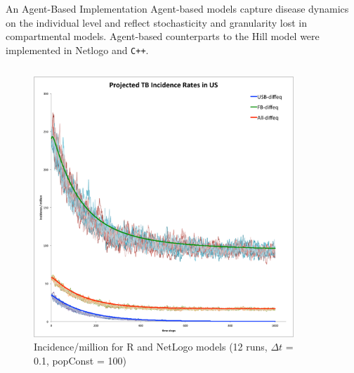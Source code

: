 \documentclass[final]{beamer}
\begin{document}
\begin{frame}
\begin{columns}[T]
    \begin{column}{.3\textwidth}
      \begin{block}{An Agent-Based Implementation}
        Agent-based models capture disease dynamics on the individual level and
        reflect stochasticity and granularity lost in compartmental models.
        Agent-based counterparts to the Hill model were implemented in Netlogo
        and \texttt{C++}.
        \begin{columns}[T]
          \begin{column}{.45\textwidth}
            \begin{figure}[h]
              \begin{center}
                \includegraphics[height=0.8\textwidth,width=\textwidth]{NLHMinc}
              \end{center}
              \caption{Incidence/million for R and NetLogo models (12 runs, $\Delta t$ = 0.1, popConst = 100)}
              \label{fig:NLHMinc}
            \end{figure}
          \end{column}
          \begin{column}{.45\textwidth}
            \begin{figure}[h]
              \begin{center}

\end{center}
\end{figure}
\end{column}
\end{columns}
\end{block}
\end{column}
\end{columns}
\end{frame}
\end{document}
